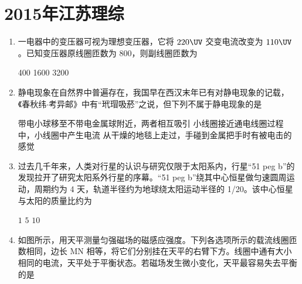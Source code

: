\documentclass[\gkver]{gaokaozhenti}
\begin{document}
\chapter{2015年江苏理综}

\begin{enumerate}
\item
一电器中的变压器可视为理想变压器，它将 $220\UV$ 交变电流改变为 $110\UV$。已知变压器原线圈匝数为 800，则副线圈匝数为

{400}
{1600}
{3200}


\item
静电现象在自然界中普遍存在，我国早在西汉末年已有对静电现象的记载，《春秋纬$\cdot$考异邮》中有“玳瑁吸菸”之说，但下列不属于静电现象的是

{带电小球移至不带电金属球附近，两者相互吸引}
{小线圈接近通电线圈过程中，小线圈中产生电流}
{从干燥的地毯上走过，手碰到金属把手时有被电击的感觉}


\item
过去几千年来，人类对行星的认识与研究仅限于太阳系内，行星“51 peg b”的发现拉开了研究太阳系外行星的序幕。“51 peg b”绕其中心恒星做匀速圆周运动，周期约为 4 天，轨道半径约为地球绕太阳运动半径的 1/20。该中心恒星与太阳的质量比约为

{$1$}
{$5$}
{$10$}


\item
如图所示，用天平测量匀强磁场的磁感应强度。下列各选项所示的载流线圈匝数相同，边长 MN 相等，将它们分别挂在天平的右臂下方。线圈中通有大小相同的电流，天平处于平衡状态。若磁场发生微小变化，天平最容易失去平衡的是


\end{enumerate}
\end{document}
